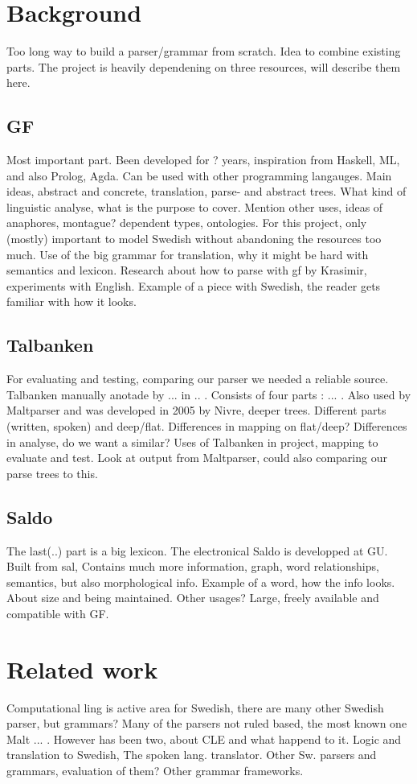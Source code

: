 \documentclass{article}
\begin{document}
\section{Background}  
Too long way to build a parser/grammar from scratch. Idea to combine existing parts. 
The project is heavily dependening on three resources, will describe them here.
\subsection{GF}
Most important part. Been developed for ? years, inspiration from Haskell, ML,
and also Prolog, Agda. Can be used with other programming langauges. 
Main ideas, abstract and concrete, translation, parse- and abstract trees.
What kind of linguistic analyse, what is the purpose to cover. Mention other uses,
ideas of anaphores, montague? dependent types, ontologies.
For this project, only (mostly) important to model Swedish without abandoning the
resources too much. Use of the big grammar for translation, why it might be hard with
semantics and lexicon.
Research about how to parse with gf by Krasimir, experiments with English.
Example of a piece with Swedish, the reader gets familiar with how it looks.

\subsection{Talbanken}
For evaluating and testing, comparing our parser we needed a reliable source.
Talbanken manually anotade by ... in .. . Consists of four parts : ... . 
Also used by Maltparser and was developed in 2005 by Nivre, deeper trees.
Different parts (written, spoken) and deep/flat. Differences in mapping
on flat/deep?
Differences in analyse, do we want a similar? 
Uses of Talbanken in project, mapping to evaluate and test.  
Look at output from Maltparser, could also comparing our parse trees to this.

\subsection{Saldo}
The last(..) part is a big lexicon. The electronical Saldo is developped at GU.
Built from sal,
Contains much more information,
graph, word relationships, semantics, but also morphological info.
Example of a word, how the info looks.
About size and being maintained. Other usages?
Large, freely available and compatible with GF. 

\section{Related work}
Computational ling is active area for Swedish, there are many other Swedish parser,
but grammars?
Many of the parsers not ruled based, the most known one Malt ... .
However has been two, about CLE and what happend to it. Logic and translation
to Swedish, The spoken lang. translator.
Other Sw. parsers and grammars, evaluation of them? 
Other grammar frameworks.
\end{document}
